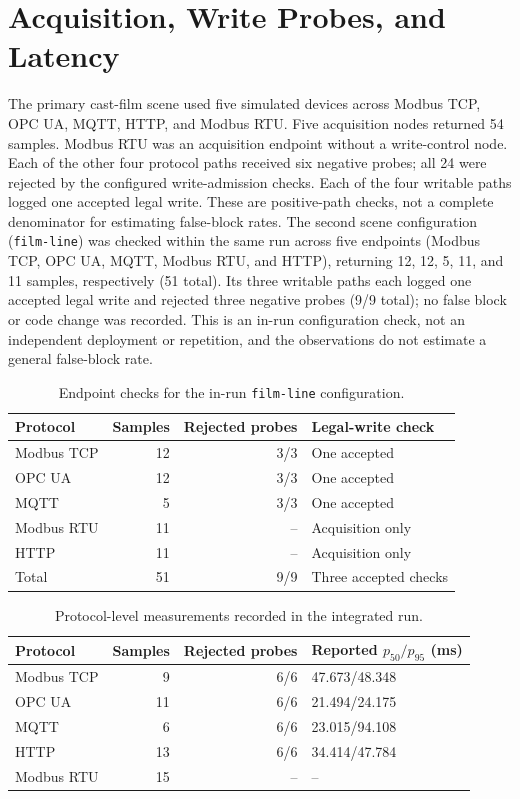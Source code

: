 \documentclass[journal]{IEEEtran}
\begin{document}
\section{Acquisition, Write Probes, and Latency}
The primary cast-film scene used five simulated devices across Modbus TCP,
OPC UA, MQTT, HTTP, and Modbus RTU. Five acquisition nodes returned 54 samples.
Modbus RTU was an acquisition
endpoint without a write-control node. Each of the other four protocol paths
received six negative probes; all 24 were rejected by the configured
write-admission checks.
Each of the four writable paths logged one accepted legal write. These are
positive-path checks, not a complete denominator for estimating false-block
rates. The second scene configuration (\texttt{film-line}) was checked within
the same run across five endpoints (Modbus TCP, OPC UA, MQTT, Modbus RTU, and HTTP), returning 12,
12, 5, 11, and 11 samples, respectively (51 total). Its three writable paths
each logged one accepted legal write and rejected three negative probes (9/9
total); no false block or code change was recorded. This is an in-run
configuration check, not an independent deployment or repetition, and the
observations do not estimate a general false-block rate.

\begin{table}[!t]
\centering
\caption{Endpoint checks for the in-run \texttt{film-line} configuration.}
\label{tab:s6-second-scene}
\footnotesize
\setlength{\tabcolsep}{3pt}
\begin{tabularx}{\columnwidth}{@{}>{\raggedright\arraybackslash}p{1.45cm}r r X@{}}
\toprule
Protocol & Samples & Rejected probes & Legal-write check\\
\midrule
Modbus TCP & 12 & 3/3 & One accepted\\
OPC UA & 12 & 3/3 & One accepted\\
MQTT & 5 & 3/3 & One accepted\\
Modbus RTU & 11 & -- & Acquisition only\\
HTTP & 11 & -- & Acquisition only\\
\midrule
Total & 51 & 9/9 & Three accepted checks\\
\bottomrule
\end{tabularx}
\end{table}

\begin{table}[!t]
\centering
\caption{Protocol-level measurements recorded in the integrated run.}
\label{tab:s6-protocol}
\footnotesize
\setlength{\tabcolsep}{3pt}
\begin{tabularx}{\columnwidth}{@{}>{\raggedright\arraybackslash}p{1.35cm}r r X@{}}
\toprule
Protocol & Samples & Rejected probes & Reported $p_{50}/p_{95}$ (ms)\\
\midrule
Modbus TCP & 9 & 6/6 & 47.673/48.348\\
OPC UA & 11 & 6/6 & 21.494/24.175\\
MQTT & 6 & 6/6 & 23.015/94.108\\
HTTP & 13 & 6/6 & 34.414/47.784\\
Modbus RTU & 15 & -- & --\\
\bottomrule
\end{tabularx}
\end{table}
\end{document}
